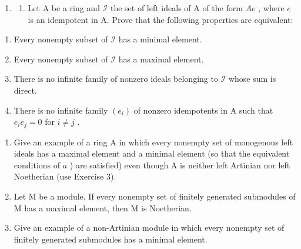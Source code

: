 \begin{enumerate}
\def\labelenumi{\arabic{enumi})}
\setcounter{enumi}{6}
\tightlist
\item
  \begin{enumerate}
  \def\labelenumii{\alph{enumii})}
  \tightlist
  \item
    Let A be a ring and \(\mathcal{I}\) the set of left ideals of A of the form \(Ae\) , where \(e\) is an idempotent in A. Prove that the following properties are equivalent:
  \end{enumerate}
\end{enumerate}

\begin{enumerate}
\def\labelenumi{(\roman{enumi})}
\item
  Every nonempty subset of \(\mathcal{I}\) has a minimal element.
\item
  Every nonempty subset of \(\mathcal{I}\) has a maximal element.
\item
  There is no infinite family of nonzero ideals belonging to \(\mathcal{I}\) whose sum is direct.
\item
  There is no infinite family \((e_i)\) of nonzero idempotents in A such that \(e_i e_j = 0\) for \(i \neq j\) .
\end{enumerate}

\begin{enumerate}
\def\labelenumi{\alph{enumi})}
\setcounter{enumi}{1}
\item
  Give an example of a ring A in which every nonempty set of monogenous left ideals has a maximal element and a minimal element (so that the equivalent conditions of \(a\) ) are satisfied) even though A is neither left Artinian nor left Noetherian (use Exercise 3).
\item
  Let M be a module. If every nonempty set of finitely generated submodules of M has a maximal element, then M is Noetherian.
\item
  Give an example of a non-Artinian module in which every nonempty set of finitely generated submodules has a minimal element.
\end{enumerate}

